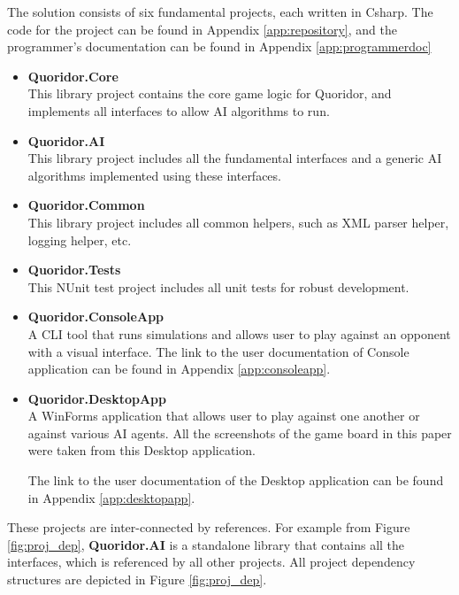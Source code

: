 The solution consists of six fundamental projects, each written in \gls{Csharp}. The code for the project can be found in Appendix \ref{app:repository}, and the programmer's documentation can be found in Appendix \ref{app:programmerdoc}

\begin{itemize}
    \item \textbf{Quoridor.Core}\\
        This library project contains the core game logic for Quoridor, and implements all interfaces to allow \gls{AI} algorithms to run.
        
    \item \textbf{Quoridor.AI}\\
        This library project includes all the fundamental interfaces and a generic \gls{AI} algorithms implemented using these interfaces.

    \item \textbf{Quoridor.Common}\\
        This library project includes all common helpers, such as XML parser helper, logging helper, etc.

    \item \textbf{Quoridor.Tests}\\
        This NUnit test project includes all unit tests for robust development.

    \item \textbf{Quoridor.ConsoleApp}\\
        A CLI tool that runs simulations and allows user to play against an opponent with a visual interface. The link to the user documentation of Console application can be found in Appendix \ref{app:consoleapp}.

    \item \textbf{Quoridor.DesktopApp}\\
        A WinForms application that allows user to play against one another or against various \gls{AI} agents. All the screenshots of the game board in this paper were taken from this Desktop application.
        
        The link to the user documentation of the Desktop application can be found in Appendix \ref{app:desktopapp}.

\end{itemize}

These projects are inter-connected by references. For example from Figure \ref{fig:proj_dep}, \textbf{Quoridor.AI} is a standalone library that contains all the interfaces, which is referenced by all other projects.
All project dependency structures are depicted in Figure \ref{fig:proj_dep}.

